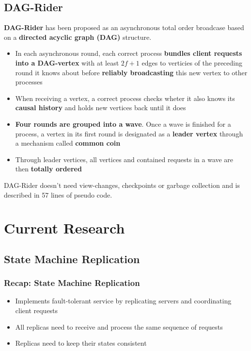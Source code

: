 \documentclass[12pt,A4]{extarticle}
\begin{document}
\subsection{DAG-Rider}
\textbf{DAG-Rider} \cite{dagRider} has been proposed as an asynchronous total order broadcase based on a \textbf{directed acyclic graph (DAG)} structure.
\begin{itemize}
  \item In each asynchronous round, each correct process \textbf{bundles client requests into a DAG-vertex} with at least $2f + 1$ edges to verticies of the preceding round it knows about before \textbf{reliably broadcasting} this new vertex to other processes
  \item When receiving a vertex, a correct process checks wheter it also knows its \textbf{causal history} and holds new vertices back until it does
  \item \textbf{Four rounds are grouped into a wave}. Once a wave is finished for a process, a vertex in its first round is designated as a \textbf{leader vertex} through a mechanism called \textbf{common coin}
  \item Through leader vertices, all vertices and contained requests in a wave are then \textbf{totally ordered}
\end{itemize}
DAG-Rider doesn't need view-changes, checkpoints or garbage collection and is described in 57 lines of pseudo code.

\section{Current Research}

\subsection{State Machine Replication}
\subsubsection{Recap: State Machine Replication}
\begin{itemize}
  \item Implements fault-tolerant service by replicating servers and coordinating client requests
  \item All replicas need to receive and process the same sequence of requests
  \item Replicas need to keep their states consistent
\end{itemize}
\end{document}
